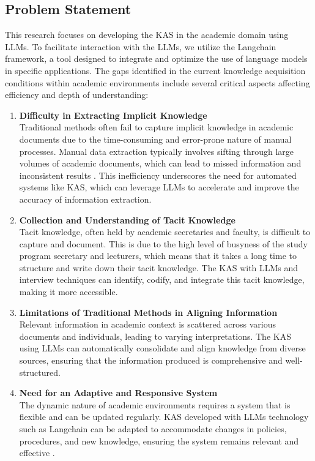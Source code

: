 \documentclass[runningheads]{llncs}
\begin{document}
\subsection{Problem Statement}
This research focuses on developing the KAS in the academic domain using LLMs. To facilitate interaction with the LLMs, we utilize the Langchain framework, a tool designed to integrate and optimize the use of language models in specific applications. The gaps identified in the current knowledge acquisition conditions within academic environments include several critical aspects affecting efficiency and depth of understanding:
\begin{enumerate}
    \item \textbf{Difficulty in Extracting Implicit Knowledge} \\
    Traditional methods often fail to capture implicit knowledge in academic documents due to the time-consuming and error-prone nature of manual processes. Manual data extraction typically involves sifting through large volumes of academic documents, which can lead to missed information and inconsistent results \cite{kiran2019}. This inefficiency underscores the need for automated systems like KAS, which can leverage LLMs to accelerate and improve the accuracy of information extraction.
    
    \item \textbf{Collection and Understanding of Tacit Knowledge} \\
    Tacit knowledge, often held by academic secretaries and faculty, is difficult to capture and document. This is due to the high level of busyness of the study program secretary and lecturers, which means that it takes a long time to structure and write down their tacit knowledge. The KAS with LLMs and interview techniques can identify, codify, and integrate this tacit knowledge, making it more accessible.
    
    \item \textbf{Limitations of Traditional Methods in Aligning Information} \\
    Relevant information in academic context is scattered across various documents and individuals, leading to varying interpretations. The KAS using LLMs can automatically consolidate and align knowledge from diverse sources, ensuring that the information produced is comprehensive and well-structured.
    
    \item \textbf{Need for an Adaptive and Responsive System} \\
    The dynamic nature of academic environments requires a system that is flexible and can be updated regularly. KAS developed with LLMs technology such as Langchain can be adapted to accommodate changes in policies, procedures, and new knowledge, ensuring the system remains relevant and effective \cite{deepLearning2023LangChain}.
\end{enumerate}
\end{document}
